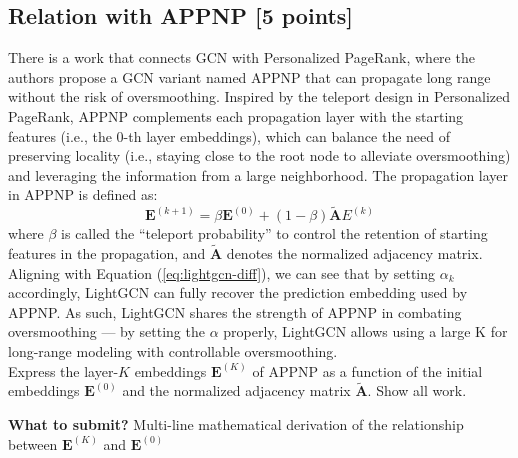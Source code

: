 \documentclass{article}
\numberwithin{figure}{section}
\begin{document}
\subsection{Relation with APPNP [5 points]}
There is a work that connects GCN with Personalized PageRank, where the authors propose a GCN variant named APPNP that can propagate long range without the risk of oversmoothing. Inspired by the teleport design in Personalized PageRank, APPNP complements each propagation layer with the starting features (i.e., the 0-th layer embeddings), which can balance the need of preserving locality (i.e., staying close to the root node to alleviate oversmoothing) and leveraging the information from a large neighborhood. The propagation layer in APPNP is defined as:
$$\mathbf{E}^{(k+1)} = \beta\mathbf{E}^{(0)}+(1-\beta)\tilde{\mathbf{A}}E^{(k)}$$
where $\beta$ is called the ``teleport probability'' to control the retention of starting features in the propagation, and $\tilde{\mathbf{A}}$ denotes the normalized adjacency matrix.\\

\noindent Aligning with Equation (\ref{eq:lightgcn-diff}), we can see that by setting $\alpha_k$ accordingly, LightGCN can fully recover the prediction embedding used by APPNP. As such, LightGCN shares the strength of APPNP in combating oversmoothing — by setting the $\alpha$ properly, LightGCN allows using a large K for long-range modeling with controllable oversmoothing.\\
\noindent Express the layer-$K$ embeddings $\mathbf{E}^{(K)}$ of APPNP as a function of the initial embeddings $\mathbf{E}^{(0)}$ and the normalized adjacency matrix $\tilde{\mathbf{A}}$. Show all work.

\textbf{What to submit?} Multi-line mathematical derivation of the relationship between $\mathbf{E}^{(K)}$ and $\mathbf{E}^{(0)}$
\end{document}
